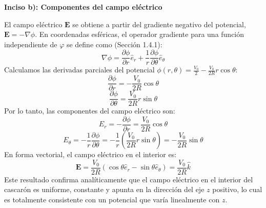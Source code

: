 \documentclass[a4paper]{article}
\begin{document}
\textbf{Inciso b): Componentes del campo eléctrico}

El campo eléctrico $\mathbf{E}$ se obtiene a partir del gradiente negativo del potencial, $\mathbf{E} = -\nabla \phi$. En coordenadas esféricas, el operador gradiente para una función independiente de $\varphi$ se define como (Sección 1.4.1):
$$
\nabla \phi = \frac{\partial \phi}{\partial r} \hat{e}_r + \frac{1}{r} \frac{\partial \phi}{\partial \theta} \hat{e}_\theta
$$
Calculamos las derivadas parciales del potencial $\phi(r,\theta) = \frac{V_0}{2} - \frac{V_0}{2R} r \cos\theta$:
$$
\frac{\partial \phi}{\partial r} = -\frac{V_0}{2R} \cos\theta
$$
$$
\frac{\partial \phi}{\partial \theta} = \frac{V_0}{2R} r \sin\theta
$$
Por lo tanto, las componentes del campo eléctrico son:
$$
E_r = -\frac{\partial \phi}{\partial r} = \frac{V_0}{2R} \cos\theta
$$
$$
E_\theta = -\frac{1}{r} \frac{\partial \phi}{\partial \theta} = -\frac{1}{r} \left( \frac{V_0}{2R} r \sin\theta \right) = -\frac{V_0}{2R} \sin\theta
$$
En forma vectorial, el campo eléctrico en el interior es:
$$
\mathbf{E} = \frac{V_0}{2R} (\cos\theta \hat{e}_r - \sin\theta \hat{e}_\theta) = \frac{V_0}{2R} \hat{k}
$$
Este resultado confirma analíticamente que el campo eléctrico en el interior del cascarón es uniforme, constante y apunta en la dirección del eje $z$ positivo, lo cual es totalmente consistente con un potencial que varía linealmente con $z$.
\end{document}
